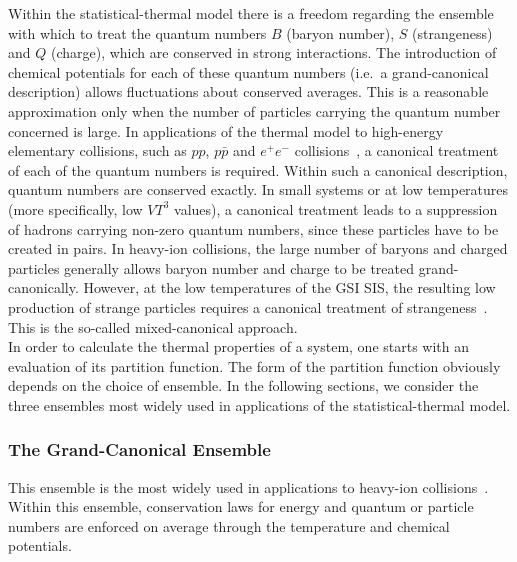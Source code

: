 \documentclass{elsarticle}
\begin{document}
Within the statistical-thermal model there is a freedom regarding the ensemble
with which to treat the quantum numbers $B$ (baryon number), $S$ (strangeness) 
and $Q$ (charge), which are
conserved in strong interactions. The introduction of chemical 
potentials for each of these quantum numbers 
(i.e.\ a grand-canonical description) allows fluctuations about
conserved averages. This is a reasonable approximation only when the
number of particles carrying the quantum number concerned is large. In
applications of the thermal model to high-energy elementary
collisions, such as $pp$, $p\bar{p}$ and $e^+e^-$ collisions~\cite{Becattini:1995if,Becattini:1997rv}, a
canonical treatment of each of the quantum numbers is required. Within
such a canonical description, quantum numbers are conserved
exactly. In small systems or at low temperatures (more specifically,
low $VT^3$ values), a canonical treatment leads to a suppression of
hadrons carrying non-zero quantum numbers, since these particles have
to be created in pairs. In heavy-ion collisions, the large number of
baryons and charged particles generally allows baryon number and charge to be
treated grand-canonically. However, at the low temperatures of the GSI
SIS, the resulting low production of strange particles requires a
canonical treatment of strangeness~\cite{Cleymans:1997sw}. This is the so-called
mixed-canonical approach. \\ 

In order to calculate the thermal properties of a system, one starts with 
an evaluation of its partition function. The form of the partition function 
obviously depends on the choice of ensemble. In the following sections, we consider 
the three ensembles most widely used in applications of the statistical-thermal model.\\

\subsubsection{The Grand-Canonical Ensemble}\label{SubSection::GCanEnsemble}

This ensemble is the most widely used in applications to heavy-ion 
collisions~\cite{BraunMunzinger:2003zd,Redlich:2002ij,Becattini:2000jw,BraunMunzinger:1999qy,BraunMunzinger:1994xr,BraunMunzinger:1995bp,BraunMunzinger:2001ip,Sollfrank:1997qv,Broniowski:2001uk,Florkowski:2001fp,Xu:2001zj,Kaneta:1997qf,Kaneta:2001ra}. 
Within this ensemble, conservation laws for energy and quantum or particle numbers 
are enforced on average through the temperature and chemical potentials.\\
\end{document}
